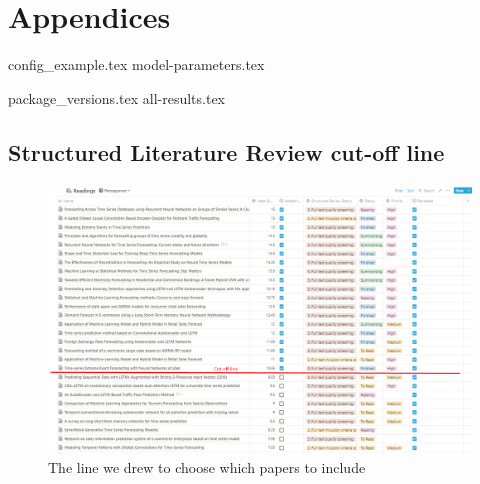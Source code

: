 
\chapter{Appendices}
\label{cha:appendices}
{config_example.tex}
{model-parameters.tex}

{package_versions.tex}
{all-results.tex}

\section{Structured Literature Review cut-off line}
\label{cha:slr-cut-off-line}

\begin{figure}[H]
  \centering
  \includegraphics[width=\textwidth]{./figs/illustrations/LSR-cut-off-line.png}
  \hfill
  \caption{The line we drew to choose which papers to include}
  \label{fig:slr-cut-off-line}
\end{figure}


